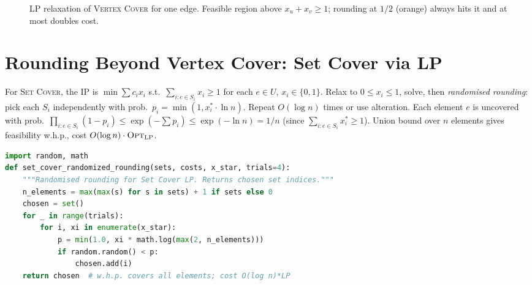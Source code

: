 \begin{figure}[h]\centering
{}
\caption{LP relaxation of \textsc{Vertex Cover} for one edge. Feasible region above $x_u+x_v\ge1$; rounding at $1/2$ (orange) always hits it and at most doubles cost.}
\label{fig:lp-round}
\end{figure}

\section{Rounding Beyond Vertex Cover: Set Cover via LP}
\label{sec:lp-setcover}

For \textsc{Set Cover}, the IP is $\min\sum c_i x_i$ s.t.\ $\sum_{i:e\in S_i}x_i\ge1$ for each $e\in U$, $x_i\in\{0,1\}$. Relax to $0\le x_i\le1$, solve, then \emph{randomised rounding}: pick each $S_i$ independently with prob.\ $p_i=\min(1, x^*_i\cdot\ln n)$. Repeat $O(\log n)$ times or use alteration. Each element $e$ is uncovered with prob.\ $\prod_{i:e\in S_i}(1-p_i)\le\exp(-\sum p_i)\le\exp(-\ln n)=1/n$ (since $\sum_{i:e\in S_i}x^*_i\ge1$). Union bound over $n$ elements gives feasibility w.h.p., cost $O(\log n)\cdot\textsc{Opt}_{\text{LP}}$.

\begin{lstlisting}[language=Python]
import random, math
def set_cover_randomized_rounding(sets, costs, x_star, trials=4):
    """Randomised rounding for Set Cover LP. Returns chosen set indices."""
    n_elements = max(max(s) for s in sets) + 1 if sets else 0
    chosen = set()
    for _ in range(trials):
        for i, xi in enumerate(x_star):
            p = min(1.0, xi * math.log(max(2, n_elements)))
            if random.random() < p:
                chosen.add(i)
    return chosen  # w.h.p. covers all elements; cost O(log n)*LP
\end{lstlisting}

